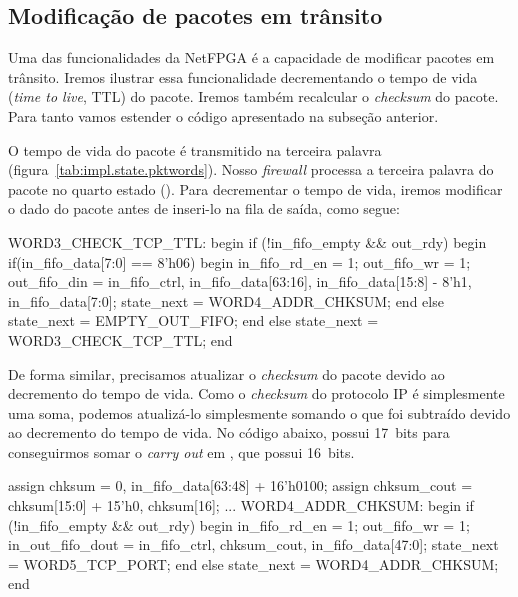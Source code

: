 \subsection{Modificação de pacotes em trânsito}
\label{sec:impl.mod}

Uma das funcionalidades da NetFPGA é a capacidade de modificar
pacotes em trânsito.  Iremos ilustrar essa funcionalidade
decrementando o tempo de vida (\emph{time to live}, TTL) do pacote.
Iremos também recalcular o \emph{checksum} do pacote.  Para tanto
vamos estender o código apresentado na subseção anterior.

O tempo de vida do pacote é transmitido na terceira palavra
(figura~\ref{tab:impl.state.pktwords}).  Nosso \emph{firewall}
processa a terceira palavra do pacote no quarto estado
().  Para decrementar o tempo de vida, iremos
modificar o dado do pacote antes de inseri-lo na fila de saída, como
segue:

\begin{verilogcode}
      WORD3_CHECK_TCP_TTL: begin
         if (!in_fifo_empty && out_rdy) begin
            if(in_fifo_data[7:0] == 8'h06) begin
               in_fifo_rd_en = 1;
               out_fifo_wr = 1;
               out_fifo_din = {in_fifo_ctrl, in_fifo_data[63:16],
                               in_fifo_data[15:8] - 8'h1,
                               in_fifo_data[7:0]};
               state_next = WORD4_ADDR_CHKSUM;
            end
            else
               state_next = EMPTY_OUT_FIFO;
         end
         else
            state_next = WORD3_CHECK_TCP_TTL;
      end
\end{verilogcode}

De forma similar, precisamos atualizar o \emph{checksum} do pacote
devido ao decremento do tempo de vida.  Como o \emph{checksum} do
protocolo IP é simplesmente uma soma, podemos atualizá-lo
simplesmente somando o que foi subtraído devido ao decremento do
tempo de vida.\footnotemark{} No código abaixo,  possui
17~bits para conseguirmos somar o \emph{carry out} em , que possui 16~bits.


\begin{verilogcode}
      assign chksum = {0, in_fifo_data[63:48]} + 16'h0100;
      assign chksum_cout = chksum[15:0] + {15'h0, chksum[16]};
        ...
      WORD4_ADDR_CHKSUM: begin
        if (!in_fifo_empty && out_rdy) begin
            in_fifo_rd_en = 1;
            out_fifo_wr = 1;
            in_out_fifo_dout = {in_fifo_ctrl, chksum_cout,
                        in_fifo_data[47:0]};
            state_next = WORD5_TCP_PORT;
        end
        else
            state_next = WORD4_ADDR_CHKSUM;
      end
\end{verilogcode}

